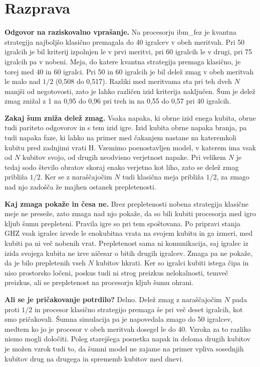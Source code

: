 \section{Razprava}
\label{g20:sec:razprava}

\textbf{Odgovor na raziskovalno vprašanje.} Na procesorju ibm\_fez je kvantna strategija najboljšo klasično premagala do 40 igralcev v obeh meritvah. Pri 50 igralcih je bil kriterij izpolnjen le v prvi meritvi, pri 60 igralcih le v drugi, pri 75 igralcih pa v nobeni. Meja, do katere kvantna strategija premaga klasično, je torej med 40 in 60 igralci. Pri 50 in 60 igralcih je bil delež zmag v obeh meritvah le malo nad $1/2$ (0,508 do 0,517). Razliki med meritvama sta pri teh dveh $N$ manjši od negotovosti, zato je lahko različen izid kriterija naključen. Šum je delež zmag znižal z 1 na 0,95 do 0,96 pri treh in na 0,55 do 0,57 pri 40 igralcih.

\textbf{Zakaj šum zniža delež zmag.} Vsaka napaka, ki obrne izid enega kubita, obrne tudi pariteto odgovorov in s tem izid igre. Izid kubita obrne napaka branja, pa tudi napaka faze, ki lahko na primer med čakanjem nastane na kateremkoli kubitu pred zadnjimi vrati H. Vzemimo poenostavljen model, v katerem ima vsak od $N$ kubitov svojo, od drugih neodvisno verjetnost napake. Pri velikem $N$ je tedaj sodo število obratov skoraj enako verjetno kot liho, zato se delež zmag približa $1/2$. Ker se z naraščajočim $N$ tudi klasična meja približa $1/2$, za zmago nad njo zadošča že majhen ostanek prepletenosti.

\textbf{Kaj zmaga pokaže in česa ne.} Brez prepletenosti nobena strategija klasične meje ne preseže, zato zmaga nad njo pokaže, da so bili kubiti procesorja med igro kljub šumu prepleteni. Pravila igre so pri tem spoštovana. Po pripravi stanja GHZ vsak igralec izvede le enokubitna vrata na svojem kubitu in ga izmeri, med kubiti pa ni več nobenih vrat. Prepletenost sama ni komunikacija, saj igralec iz izida svojega kubita ne izve ničesar o bitih drugih igralcev. Zmaga pa ne pokaže, da je bilo prepletenih vseh $N$ kubitov hkrati. Ker so igralci kubiti istega čipa in niso prostorsko ločeni, poskus tudi ni strog preizkus nelokalnosti, temveč preizkus, ali se prepletenost na procesorju kljub šumu ohrani.

\textbf{Ali se je pričakovanje potrdilo?} Delno. Delež zmag z naraščajočim $N$ pada proti $1/2$ in procesor klasično strategijo premaga še pri več deset igralcih, kot smo pričakovali. Šumna simulacija pa je napovedala zmago do 50 igralcev, medtem ko jo je procesor v obeh meritvah dosegel le do 40. Vzroka za to razliko nismo mogli določiti. Poleg starejšega posnetka napak in deloma drugih kubitov je možen vzrok tudi to, da šumni model ne zajame na primer vpliva sosednjih kubitov drug na drugega in sprememb kubitov med dnevi.

